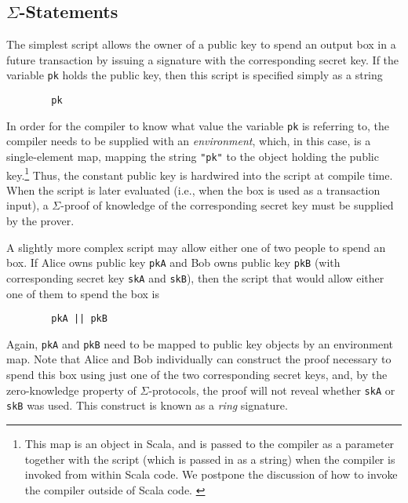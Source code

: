 \documentclass[11pt]{article}
\newcommand{\authnote}[2]{\marginpar{\parbox{\marginparwidth}{\tiny %
  \textsf{#1 {\textcolor{blue}{notes: #2}}}}}%
  \textcolor{blue}{\textbf{\dag}}}
\newcommand{\authnote}[2]{
  \textsf{#1 \textcolor{blue}{: #2}}}
\newcommand{\authnote}[2]{}
\newcommand{\lnote}[1]{{\authnote{\textcolor{orange}{Leo notes}}{#1}}}
\begin{document}
\subsection{$\Sigma$-Statements}

\lnote{every script example here should be also in our test code exactly as written, to make sure our own paper passes our own tests. These should be edited as the language evolves.}

\lnote{If we want to show examples of the underlying syntax tree to which the language gets compiled, we can to that here, in parallel with examples in the language}

The simplest script allows the owner of a public key to spend an output box in a future transaction by issuing a signature with the corresponding secret key. If the variable \texttt{pk} holds the public key, then this script is specified simply as a string
\begin{verbatim}
        pk
\end{verbatim}

In order for the compiler to know what value the variable \texttt{pk} is referring to, the compiler needs to be supplied with an \emph{environment}, which, in this case, is a single-element map, mapping the string \texttt{"pk"} to the object holding the public key.\footnote{This map is an object in Scala, and is passed to the compiler as a parameter together with the script (which is passed in as a string) when the compiler is invoked from within Scala code. We postpone the discussion of how to invoke the compiler outside of Scala code.\lnote{we should add this discussion at some point}}
Thus, the constant public key is hardwired into the script at compile time. When the script is later evaluated (i.e., when the box is used as a transaction input), a $\Sigma$-proof of knowledge of the corresponding secret key must be supplied by the prover. 

A slightly more complex script may allow either one of two people to spend an box. If Alice owns public key \texttt{pkA}  and Bob owns public key \texttt{pkB} (with corresponding secret key \texttt{skA} and \texttt{skB}), then the script that would allow either one of them to spend the box is
\begin{verbatim}
        pkA || pkB
\end{verbatim}
Again, \texttt{pkA} and \texttt{pkB} need to be mapped to public key objects by an environment map.
Note that Alice and Bob individually can construct the proof necessary to spend this box using just one of the two corresponding secret keys, and, by the zero-knowledge property of $\Sigma$-protocols, the proof will not reveal whether \texttt{skA} or \texttt{skB} was used. This construct is known as a \emph{ring} signature.
\end{document}

